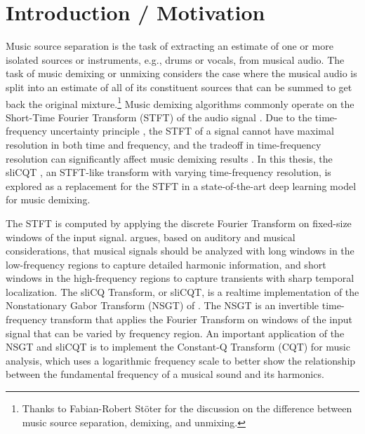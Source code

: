 \documentclass[letter,12pt]{article}
\title{\vspace{-2.25em}\ThesisTitle\vspace{-0.5em}}
\author{Sevag Hanssian}
\date{\vspace{-0.5em}November 12, 2021\vspace{-1.25em}}
\begin{document}
\maketitle

\section{Introduction / Motivation}

Music source separation is the task of extracting an estimate of one or more isolated sources or instruments, e.g., drums or vocals, from musical audio. The task of music demixing or unmixing considers the case where the musical audio is split into an estimate of all of its constituent sources that can be summed to get back the original mixture.\footnote{Thanks to Fabian-Robert St{\"o}ter for the discussion on the difference between music source separation, demixing, and unmixing.} Music demixing algorithms commonly operate on the Short-Time Fourier Transform (STFT) of the audio signal \parencite{musicsepgood}. Due to the time-frequency uncertainty principle \parencite{gabor1946}, the STFT of a signal cannot have maximal resolution in both time and frequency, and the tradeoff in time-frequency resolution can significantly affect music demixing results \parencite{tftradeoff1}. In this thesis, the sliCQT \parencite{slicq}, an STFT-like transform with varying time-frequency resolution, is explored as a replacement for the STFT in a state-of-the-art deep learning model for music demixing.

The STFT is computed by applying the discrete Fourier Transform on fixed-size windows of the input signal. \textcite{doerflerphd} argues, based on auditory and musical considerations, that musical signals should be analyzed with long windows in the low-frequency regions to capture detailed harmonic information, and short windows in the high-frequency regions to capture transients with sharp temporal localization. The sliCQ Transform, or sliCQT, is a realtime implementation of the Nonstationary Gabor Transform (NSGT) of \textcite{balazs}. The NSGT is an invertible time-frequency transform that applies the Fourier Transform on windows of the input signal that can be varied by frequency region. An important application of the NSGT and sliCQT is to implement the Constant-Q Transform (CQT) \parencite{jbrown} for music analysis, which uses a logarithmic frequency scale to better show the relationship between the fundamental frequency of a musical sound and its harmonics.
\end{document}
